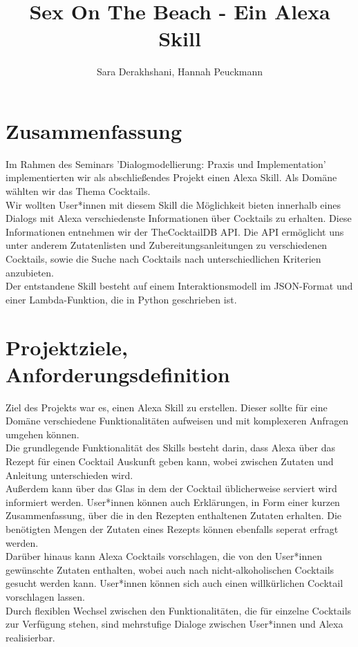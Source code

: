 \documentclass[12pt,letterpaper]{article}
\begin{document}
\title{Sex On The Beach - Ein Alexa Skill}
\author{Sara Derakhshani, Hannah Peuckmann}
\maketitle
\thispagestyle{fancy}
\pagebreak
\tableofcontents
\pagebreak
\section{Zusammenfassung}
Im Rahmen des Seminars 'Dialogmodellierung: Praxis und Implementation' implementierten wir als abschließendes Projekt einen Alexa Skill. Als Domäne wählten wir das Thema Cocktails. \\Wir wollten User*innen mit diesem Skill die Möglichkeit bieten innerhalb eines Dialogs mit Alexa verschiedenste Informationen über Cocktails zu erhalten. 
Diese Informationen entnehmen wir der TheCocktailDB API. Die API ermöglicht uns unter anderem Zutatenlisten und Zubereitungsanleitungen zu verschiedenen Cocktails, sowie die Suche nach Cocktails nach unterschiedlichen Kriterien anzubieten. \\ Der entstandene Skill besteht auf einem Interaktionsmodell im JSON-Format und einer Lambda-Funktion, die in Python geschrieben ist. 

\section{Projektziele, Anforderungsdefinition}

Ziel des Projekts war es, einen Alexa Skill zu erstellen. Dieser sollte für eine Domäne verschiedene Funktionalitäten aufweisen und mit komplexeren Anfragen umgehen können. \\
Die grundlegende Funktionalität des Skills besteht darin, dass Alexa über das Rezept für einen Cocktail Auskunft geben kann, wobei zwischen Zutaten und Anleitung unterschieden wird. \\ Außerdem kann über das Glas in dem der Cocktail üblicherweise serviert wird informiert werden. User*innen können auch Erklärungen, in Form einer kurzen Zusammenfassung, über die in den Rezepten enthaltenen Zutaten erhalten. Die benötigten Mengen der Zutaten eines Rezepts können ebenfalls seperat erfragt werden. \\
Darüber hinaus kann Alexa Cocktails vorschlagen, die von den User*innen gewünschte Zutaten enthalten, wobei auch nach nicht-alkoholischen Cocktails gesucht werden kann. 
User*innen können sich auch einen willkürlichen Cocktail vorschlagen lassen. \\ Durch flexiblen Wechsel zwischen den Funktionalitäten, die für einzelne Cocktails zur Verfügung stehen, sind mehrstufige Dialoge zwischen User*innen und Alexa realisierbar.
\end{document}
